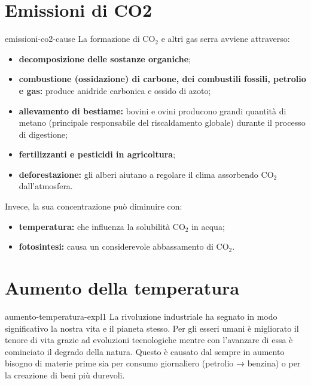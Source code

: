 \documentclass[preview]{standalone}
\begin{document}
\section{Emissioni di CO2}

\begin{snippet}{emissioni-co2-cause}
    La formazione di CO\({}_2\) e altri gas serra avviene attraverso:
    \begin{itemize}
        \item \textbf{decomposizione delle sostanze organiche};
        \item \textbf{combustione (ossidazione) di carbone, dei combustili fossili, petrolio e
        gas:} produce anidride carbonica e ossido di azoto;
        \item \textbf{allevamento di bestiame:} bovini e ovini producono grandi quantità
        di metano (principale responsabile del riscaldamento globale) durante il processo di
        digestione;
        \item \textbf{fertilizzanti e pesticidi in agricoltura};
        \item \textbf{deforestazione:} gli alberi aiutano a regolare il clima
        assorbendo CO\({}_2\) dall'atmosfera.
    \end{itemize}
    Invece, la sua concentrazione può diminuire con:
    \begin{itemize}
        \item \textbf{temperatura:} che influenza la solubilità CO\({}_2\) in acqua;
        \item \textbf{fotosintesi:} causa un considerevole abbassamento di CO\({}_2\).
    \end{itemize} 
\end{snippet}

\section{Aumento della temperatura}

\begin{snippet}{aumento-temperatura-expl1}
    La rivoluzione industriale ha segnato in
    modo significativo la nostra vita e il
    pianeta stesso. Per gli esseri umani è
    migliorato il tenore di vita grazie ad
    evoluzioni tecnologiche mentre con l'avanzare di essa è cominciato il
    degrado della
    natura. Questo è causato dal sempre in aumento bisogno di materie prime sia per
    consumo giornaliero (petrolio → benzina) o per la creazione di beni più durevoli.
\end{snippet}
\end{document}
